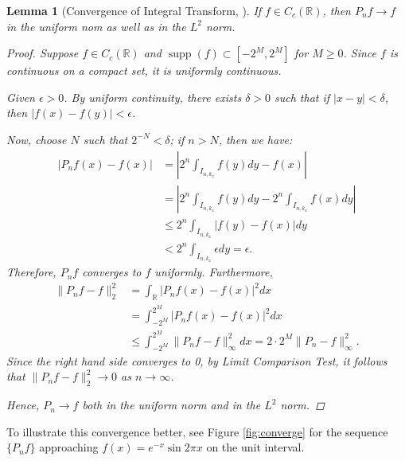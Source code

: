 \documentclass[11pt]{amsart}
\theoremstyle{theorem} %
\newtheorem{lem}[thm]{Lemma} %
\theoremstyle{definition}
\theoremstyle{example}
\theoremstyle{remark}
\numberwithin{equation}{section}
\newcommand{\R}{\mathbb{R}}
\DeclareMathOperator*{\supp}{supp}
\begin{document}
\begin{lem}[Convergence of Integral Transform, {\cite[517]{davidson}}] \label{lem:convergence}
	If $ f \in C_c(\R) $, then $ P_nf \to f $ in the uniform nom as well as in the $ L^2 $ norm.
	
	\begin{proof}
		Suppose $ f \in C_c(\R) $ and $ \supp(f) \subset [-2^M, 2^M] $ for $ M \geq 0 $. Since $ f $ is continuous on a compact set, it is uniformly continuous.
		
		Given $ \epsilon > 0 $. By uniform continuity, there exists $ \delta > 0 $ such that if $ |x-y| < \delta $, then $ |f(x) - f(y)| < \epsilon $.
		
		Now, choose $ N $ such that $ 2^{-N} < \delta $; if $ n > N $, then we have:
		\begin{align*}
		|P_nf(x) - f(x)| &= \left| 2^n \int_{I_{n,k_x}} f(y)dy - f(x) \right| \\
		&=  \left| 2^n \int_{I_{n,k_x}} f(y)dy - 2^n \int_{I_{n,k_x}} f(x) dy \right| \\
		&\leq 2^n \int_{I_{n,k_x}} |f(y) - f(x)| dy\\
		&< 2^n \int_{I_{n,k_x}} \epsilon dy = \epsilon.
		\end{align*}
		Therefore, $ P_nf $ converges to $ f $ uniformly. Furthermore,
		\begin{align*}
		\| P_nf - f \|_2^2 &= \int_{\R} |P_nf(x) - f(x)|^2dx \\
		&= \int_{-2^M}^{2^M} |P_nf(x) - f(x)|^2dx \\
		&\leq \int_{-2^M}^{2^M} \|P_nf - f\|_\infty^2dx = 2 \cdot 2^M \| P_n - f \|_\infty^2.
		\end{align*}
		Since the right hand side converges to 0, by Limit Comparison Test, it follows that $ \| P_nf-f \|_2^2 \to 0 $ as $ n \to \infty $.
		
		Hence, $ P_n \to f $ both in the uniform norm and in the $ L^2 $ norm.
	\end{proof}
\end{lem}

To illustrate this convergence better, see Figure \ref{fig:converge} for the sequence $ \{P_nf\} $ approaching $ f(x) = e^{-x} \sin{2\pi x} $ on the unit interval.
\end{document}
